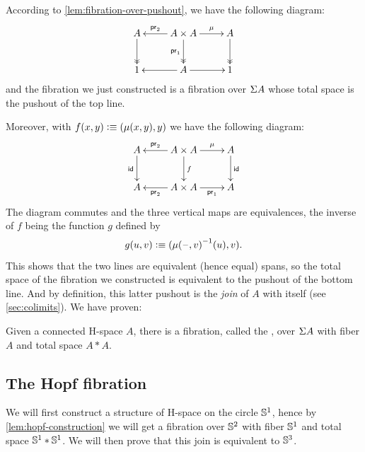 According to \cref{lem:fibration-over-pushout}, we have the following
diagram:
%
\[\xymatrix{A \ar@{->>}[d] & A \times A \ar[l]_-{\proj2} \ar@{->>}_{\proj1}[d]
  \ar[r]^-{\mu} & A \ar@{->>}[d] \\
  1 & A \ar[r] \ar[l] & 1}\]
%
and the fibration we just constructed is a fibration over $\Sigma A$ whose total
space is the pushout of the top line.

Moreover, with $f(x,y)\vcentcolon\equiv(\mu(x,y),y)$ we have the following diagram:
%
\[\xymatrix{A \ar_\idfunc[d] & A \times A \ar[l]_-{\proj2} \ar^f[d]
  \ar[r]^-{\mu} & A \ar^\idfunc[d] \\
  A & A\times A \ar^-{\proj2}[l] \ar_-{\proj1}[r] & A}\]
%
The diagram commutes and the three vertical maps are equivalences, the inverse
of $f$ being the function $g$ defined by
\[g(u,v)\vcentcolon\equiv(\mathord{{\mu(\mathord{\hspace{1pt}\text{--}\hspace{1pt}},v)}^{-1}}(u),v).\]
%
This shows that the two lines are equivalent (hence equal) spans, so the total
space of the fibration we constructed is equivalent to the pushout of the bottom
line.
And by definition, this latter pushout is the \emph{join} of $A$ with itself (see \cref{sec:colimits}).
%
We have proven:

\begin{lem}\label{lem:hopf-construction}
  Given a connected H-space $A$, there is a fibration, called the
  ,
  over $\Sigma A$ with fiber $A$ and total space $A*A$.
\end{lem}

\subsection{The Hopf fibration}

We will first construct a structure of H-space on the circle $\mathbb{S}^1$, hence by
\cref{lem:hopf-construction} we will get a fibration over $\mathbb{S}^2$ with fiber
$\mathbb{S}^1$ and total space $\mathbb{S}^1*\mathbb{S}^1$. We will then prove that this join is
equivalent to $\mathbb{S}^3$.

